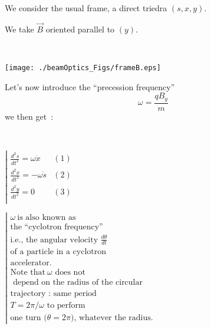 \documentclass[12pt]{paper}
\newcommand{\B}{\ensuremath{\vec B}}
\newcommand{\nin}{\noindent}
\newcommand{\blue}{\color{blue}}
\begin{document}
\hfill
\begin{minipage}[b]{.27\linewidth}
\centering
\Large

\blue 
We consider the usual  frame, a direct triedra  $(s,x,y)$. 

We take $\B$  oriented parallel to $(y)$. 

~

\texttt{[image: ./beamOptics\_Figs/frameB.eps]}

\end{minipage}




\clearpage 


\begin{minipage}[b]{.50\linewidth}

\nin Let's now  introduce the ``precession frequency''  
$$ \omega = \frac{\textstyle{qB_y}}{\textstyle{m}}$$
we then get~: ~ ~ ~  

~

\begin{center}
$\left| 
\begin{array}{lr} 
\frac{\textstyle{d^2s}}{\textstyle{dt^2}} = \omega \dot x     & (1)\\
\frac{\textstyle{d^2x}}{\textstyle{dt^2}} = - \omega \dot s    & (2)\\
\frac{\textstyle{d^2y}}{\textstyle{dt^2}} = 0             & (3)\\
\end{array} 
\right.$
\end{center}


\end{minipage}
\hfill
\begin{minipage}[b]{.42\linewidth}
\centering
\Large
\blue
\begin{center}
$\left| 
\begin{array}{lr} 
\omega ~ \textrm{is also known as }\\
\textrm{the ``cyclotron frequency''} \\
\textrm{i.e., the angular velocity } \frac{\textstyle{d\theta}}{\textstyle{dt}} \\
\textrm{of a particle in a cyclotron } \\
\textrm{accelerator. } \\
\textrm{Note that} ~ \omega \textrm{ does not}  \\
\textrm{ depend on the radius of the circular }  \\
\textrm{trajectory~: same period }    \\
\textrm{$T=2\pi/\omega$ to perform   }  \\
\textrm{one turn ($\theta = 2\pi$), whatever the radius. }  
\end{array} 
\right.$
\end{center}



\end{minipage}
\end{document}
